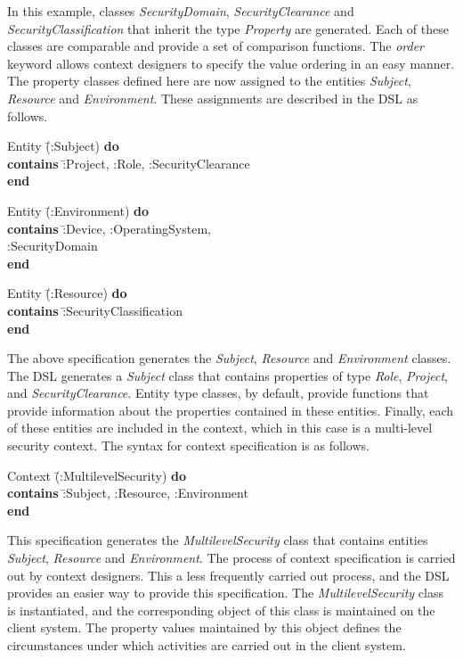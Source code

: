 In this example, classes {\em SecurityDomain}, {\em SecurityClearance} and {\em SecurityClassification} that inherit the type {\em Property} are generated. Each of these classes are comparable and provide a set of comparison functions. The {\em order} keyword allows context designers to specify the value ordering in an easy manner. The property classes defined here are now assigned to the entities {\em Subject}, {\em Resource} and {\em Environment}. These assignments are described in the DSL as follows. 

\begin{tabbing}
 Entity \= (:Subject) {\bf do} \\
\>	 {\bf contains} \=  :Project, :Role, :SecurityClearance \\
	 {\bf end}
\end{tabbing}

\begin{tabbing}
 Entity \= (:Environment) {\bf do} \\
\>	 {\bf contains} \=  :Device, :OperatingSystem,\\
\> \>                                 :SecurityDomain \\
	 {\bf end}
\end{tabbing}

\begin{tabbing}
 Entity \= (:Resource) {\bf do} \\
\>	 {\bf contains} \=  :SecurityClassification \\
	 {\bf end}
\end{tabbing}

The above specification generates the {\em Subject}, {\em Resource} and {\em Environment} classes. The DSL generates a {\em Subject} class that contains properties of type {\em Role}, {\em Project}, and {\em SecurityClearance}. Entity type classes, by default, provide functions that provide information about the  properties contained in these entities. Finally, each of these entities are included in the context, which in this case is a multi-level security context. The syntax for context specification is as follows. 

\begin{tabbing}
 Context \= (:MultilevelSecurity) {\bf do} \\
\>	 {\bf contains} \=  :Subject, :Resource, :Environment \\
	 {\bf end}
\end{tabbing}

This specification generates the {\em MultilevelSecurity} class that contains entities {\em Subject}, {\em Resource} and {\em Environment}. The process of context specification is carried out by context designers. This a less frequently carried out process, and the DSL provides an easier way to provide this specification. The {\em MultilevelSecurity} class is instantiated, and the corresponding object of this class is maintained on the client system. The property values maintained by this object defines the circumstances under which activities are carried out in the client system. 

